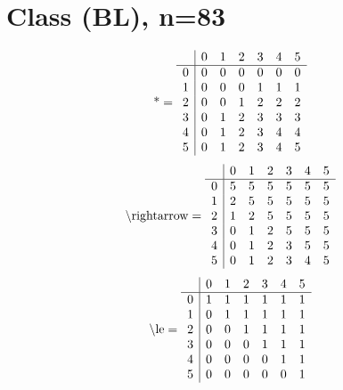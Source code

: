 \documentclass[11pt]{article}
\begin{document}
\section{Class (BL), n=83}
\[\text{*} = 
\begin{array}{r | r r r r r r}
 & 0 & 1 & 2 & 3 & 4 & 5 \\ \hline
0 & 0 & 0 & 0 & 0 & 0 & 0 \\
1 & 0 & 0 & 0 & 1 & 1 & 1 \\
2 & 0 & 0 & 1 & 2 & 2 & 2 \\
3 & 0 & 1 & 2 & 3 & 3 & 3 \\
4 & 0 & 1 & 2 & 3 & 4 & 4 \\
5 & 0 & 1 & 2 & 3 & 4 & 5 \\
\end{array}
\]
\[\text{\textbackslash rightarrow} = 
\begin{array}{r | r r r r r r}
 & 0 & 1 & 2 & 3 & 4 & 5 \\ \hline
0 & 5 & 5 & 5 & 5 & 5 & 5 \\
1 & 2 & 5 & 5 & 5 & 5 & 5 \\
2 & 1 & 2 & 5 & 5 & 5 & 5 \\
3 & 0 & 1 & 2 & 5 & 5 & 5 \\
4 & 0 & 1 & 2 & 3 & 5 & 5 \\
5 & 0 & 1 & 2 & 3 & 4 & 5 \\
\end{array}
\]
\[\text{\textbackslash le} = 
\begin{array}{r | r r r r r r}
 & 0 & 1 & 2 & 3 & 4 & 5 \\ \hline
0 & 1 & 1 & 1 & 1 & 1 & 1 \\
1 & 0 & 1 & 1 & 1 & 1 & 1 \\
2 & 0 & 0 & 1 & 1 & 1 & 1 \\
3 & 0 & 0 & 0 & 1 & 1 & 1 \\
4 & 0 & 0 & 0 & 0 & 1 & 1 \\
5 & 0 & 0 & 0 & 0 & 0 & 1 \\
\end{array}
\]
\end{document}
